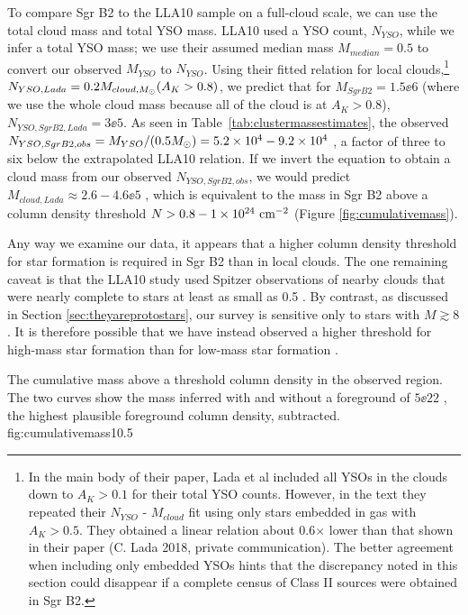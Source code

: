 \documentclass[twocolumn]{aastex61}
\begin{document}
To compare Sgr B2 to the LLA10 sample on a full-cloud scale, we can use
the total cloud mass and total YSO mass.  LLA10 used a YSO count, $N_{YSO}$,
while we infer a total YSO mass; we use their assumed median mass $M_{median} =
0.5$ \msun to convert our observed $M_{YSO}$ to $N_{YSO}$.  Using their
fitted relation for local clouds,\footnote{In the main body of their paper, Lada
et al included all YSOs in the clouds down to $A_K>0.1$ for their total YSO
counts.  However, in the text they repeated their $N_{YSO}$ - $M_{cloud}$ fit
using only stars embedded in gas with $A_K>0.5$.  They obtained a linear
relation about 0.6$\times$ lower than that shown in their paper (C. Lada 2018,
private communication).  The better agreement when including only embedded
YSOs hints that the discrepancy noted in this section could disappear if a
complete census of Class II sources were obtained in Sgr B2.} 
$N_{YSO,Lada} = 0.2 M_{cloud,M_{\odot}}(A_K>0.8)$,
we predict that for $M_{Sgr B2}=1.5\ee{6}$ \msun (where we use the whole cloud
mass because all of the cloud is at $A_K>0.8$), $N_{YSO,Sgr B2,Lada} =
3\ee{5}$.  As seen in Table~\ref{tab:clustermassestimates}, the observed
$N_{YSO,Sgr B2,obs} = M_{YSO} /
(0.5 M_{\odot}) = 5.2\times10^{4}-9.2\times10^{4}$ \msun, a factor of three to six below the
extrapolated LLA10 relation.  If we invert the equation to obtain a cloud
mass from our
observed $N_{YSO,Sgr B2,obs}$, we would predict $M_{cloud,Lada}\approx2.6-4.6\ee{5}$ 
\msun,
which is equivalent to the mass in Sgr B2 above a column density threshold
$N>0.8-1\times10^{24}~\textrm{cm}^{-2}$ (Figure \ref{fig:cumulativemass}).

Any way we examine our data, it appears that a higher column density threshold
for star formation is required in Sgr B2 than in local clouds.  The one
remaining caveat is that the LLA10 study  used Spitzer observations of nearby
clouds that were nearly complete to stars at least as small as 0.5 \msun.  By
contrast, as discussed in Section \ref{sec:theyareprotostars}, our survey is
sensitive only to stars with $M\gtrsim8$ \msun.  It is therefore possible that
we have instead observed a higher threshold for high-mass star formation than
for low-mass star formation \citep[e.g., as suggested by ][]{Krumholz2008a}.


{The cumulative mass above a threshold column density in the observed
region.  The two curves show the mass inferred with and without a
foreground of $5\ee{22}$ \persc, the highest plausible foreground column
density, subtracted.}
{fig:cumulativemass}{1}{0.5\textwidth}
\end{document}
